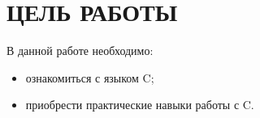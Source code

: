 
\section{ЦЕЛЬ РАБОТЫ}

В данной работе необходимо:

\begin{itemize} 
	\item ознакомиться с языком C;
	\item приобрести практические навыки работы с C.
\end{itemize}

\newpage